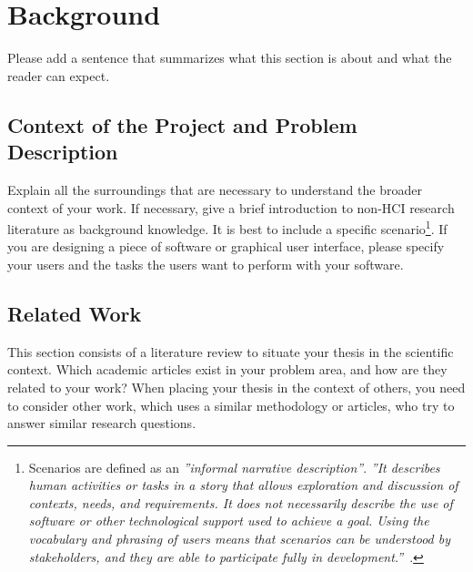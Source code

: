 \section{Background}
\label{sec:background}
Please add a sentence that summarizes what this section is about and what the reader can expect.
\subsection{Context of the Project and Problem Description} 
\label{sec:context}
Explain all the surroundings that are necessary to understand the broader context of your work. If necessary, give a brief introduction to non-HCI research literature as background knowledge. It is best to include a specific scenario\footnote{Scenarios are defined as an \emph{''informal narrative description''}. \emph{''It describes human activities or tasks in a story that allows exploration and discussion of contexts, needs, and requirements. It does not necessarily describe the use of software or other technological support used to achieve a goal. Using the vocabulary and phrasing of users means that scenarios can be understood by stakeholders, and they are able to participate fully in development.''}~\cite{preeceInteractionDesignHumancomputer2015}.}. If you are designing a piece of software or graphical user interface, please specify your users and the tasks the users want to perform with your software.

\subsection{Related Work}
\label{sec:relatedwork}
This section consists of a literature review to situate your thesis in the scientific context. Which academic articles exist in your problem area, and how are they related to your work? When placing your thesis in the context of others, you need to consider other work, which uses a similar methodology or articles, who try to answer similar research questions.

